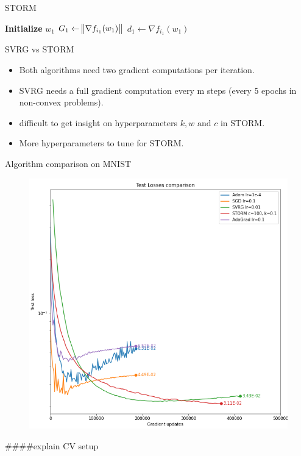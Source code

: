 \documentclass[10pt]{beamer}
\begin{document}
\begin{frame}{STORM}
    \begin{algorithm}[H]
        \DontPrintSemicolon
        \SetAlgoNoLine

        \textbf{Initialize} $w_1$\;
        $G_1 \gets \norm {\nabla f_{i_1}(w_1)}$\;
        $d_1 \gets \nabla f_{i_1}(w_1)$\;
        \caption{{\textsc{STORM Procedure}}}
        \label{algo:storm}
    \end{algorithm}
\end{frame}


\begin{frame}{SVRG vs STORM}
\begin{itemize}
    \item Both algorithms need two gradient computations per iteration.
    \item SVRG needs a full gradient computation every m steps (every 5 epochs in non-convex problems).
    \item difficult to get insight on hyperparameters $k,w \text{ and } c$ in STORM.
    \item More hyperparameters to tune for STORM.
\end{itemize}
\end{frame}

\begin{frame}{Algorithm comparison on MNIST}
    \begin{figure}
        \centering
    \includegraphics[scale=0.35]{midterm presentation/images/testLossesMnist.png}
        \label{fig:testLossesMnist}
    \end{figure}   
\end{frame}
####explain CV setup
\end{document}
